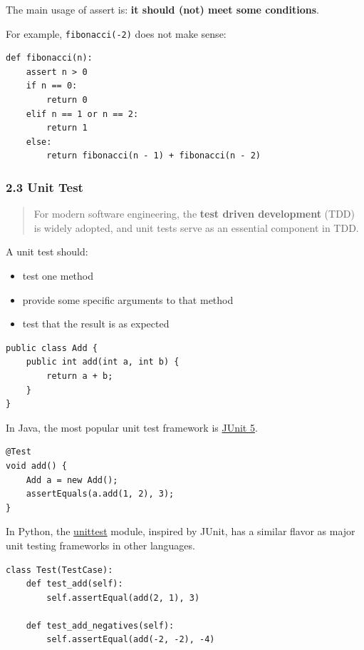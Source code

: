 \documentclass[aspectratio=169, 14pt]{beamer}
\begin{document}
\begin{frame}[fragile]
The main usage of \alert{assert} is: \textbf{it should (not) meet some conditions}.

For example, \texttt{fibonacci(-2)} does not make sense:

\begin{verbatim}
def fibonacci(n):
    assert n > 0
    if n == 0:
        return 0
    elif n == 1 or n == 2:
        return 1
    else:
        return fibonacci(n - 1) + fibonacci(n - 2) 
\end{verbatim}  

\end{frame}

\begin{frame}
    \frametitle{2.3 Unit Test}
\begin{quote}
    For modern software engineering, the \textbf{test driven development} (TDD) is widely adopted, and \alert{unit tests} serve as an essential component in TDD. 
\end{quote}

A unit test should:
\begin{itemize}
    \item test one method
    \item provide some specific arguments to that method
    \item test that the result is as expected
\end{itemize}
\end{frame}

\begin{frame}[fragile]

    \begin{verbatim}
public class Add {
    public int add(int a, int b) {
        return a + b;
    }
}
    \end{verbatim}  
In Java, the most popular unit test framework is \href{https://junit.org/junit5/}{JUnit 5}.

\begin{verbatim}
@Test
void add() {
    Add a = new Add();
    assertEquals(a.add(1, 2), 3);
}    
\end{verbatim}

\end{frame}

\begin{frame}[fragile]
In Python, the \href{https://docs.python.org/3/library/unittest.html}{unittest} module, inspired by JUnit, has a similar flavor as major unit testing frameworks in other languages.
\begin{verbatim}
class Test(TestCase):
    def test_add(self):
        self.assertEqual(add(2, 1), 3)

    def test_add_negatives(self):
        self.assertEqual(add(-2, -2), -4)    
\end{verbatim}

\end{frame}
\end{document}
